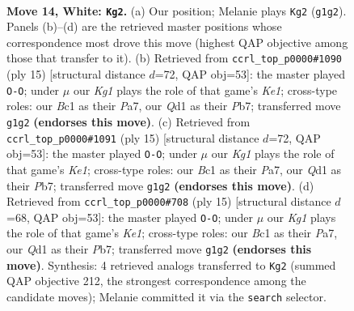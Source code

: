 \documentclass[11pt]{article}
\begin{document}
\clearpage

\begin{figure}[p]\centering
\begin{subfigure}{0.46\textwidth}\centering
\resizebox{\linewidth}{!}{%
\newchessgame
\chessboard[
  setfen={r1bqr1k1/pp1nbppp/2n1p3/8/2Pp2P1/1P3N1B/P2P1P1P/RNBQR1K1 w - - 2 14},
  showmover=false,
  pgfstyle=straightmove, color=movearrow, markmove={g1-g2}
]}
\caption{}
\end{subfigure}\hfill
\begin{subfigure}{0.46\textwidth}\centering
\resizebox{\linewidth}{!}{%
\newchessgame
\chessboard[
  setfen={r1bqk2r/pp2ppbp/2np1np1/8/4PP2/1NN5/PPP1B1PP/R1BQK2R b KQkq - 4 8},
  showmover=false,
  pgfstyle=straightmove, color=movearrow, markmove={e8-g8}
]}
\caption{}
\end{subfigure}
\\[4pt]
\begin{subfigure}{0.46\textwidth}\centering
\resizebox{\linewidth}{!}{%
\newchessgame
\chessboard[
  setfen={r1bqk2r/pp2ppbp/2np1np1/8/4PP2/1NN5/PPP1B1PP/R1BQK2R b KQkq - 4 8},
  showmover=false,
  pgfstyle=straightmove, color=movearrow, markmove={e8-g8}
]}
\caption{}
\end{subfigure}\hfill
\begin{subfigure}{0.46\textwidth}\centering
\resizebox{\linewidth}{!}{%
\newchessgame
\chessboard[
  setfen={r1bqk2r/pp2ppbp/2np1np1/8/2P1P3/2N5/PPN1BPPP/R1BQK2R b KQkq - 1 8},
  showmover=false,
  pgfstyle=straightmove, color=movearrow, markmove={e8-g8}
]}
\caption{}
\end{subfigure}
\caption{\textbf{Move 14, White: \texttt{Kg2}.} (a) Our position; Melanie plays \texttt{Kg2} (\texttt{g1g2}). Panels (b)--(d) are the retrieved master positions whose correspondence most drove this move (highest QAP objective among those that transfer to it). (b) Retrieved from \texttt{ccrl\_top\_p0000\#1090} (ply 15) [structural distance $d$=72, QAP obj=53]: the master played \texttt{O-O}; under $\mu$ our \emph{Kg1} plays the role of that game's \emph{Ke1}; cross-type roles: our \emph{B}c1 as their \emph{P}a7, our \emph{Q}d1 as their \emph{P}b7; transferred move \texttt{g1g2} \textbf{(endorses this move)}. (c) Retrieved from \texttt{ccrl\_top\_p0000\#1091} (ply 15) [structural distance $d$=72, QAP obj=53]: the master played \texttt{O-O}; under $\mu$ our \emph{Kg1} plays the role of that game's \emph{Ke1}; cross-type roles: our \emph{B}c1 as their \emph{P}a7, our \emph{Q}d1 as their \emph{P}b7; transferred move \texttt{g1g2} \textbf{(endorses this move)}. (d) Retrieved from \texttt{ccrl\_top\_p0000\#708} (ply 15) [structural distance $d$=68, QAP obj=53]: the master played \texttt{O-O}; under $\mu$ our \emph{Kg1} plays the role of that game's \emph{Ke1}; cross-type roles: our \emph{B}c1 as their \emph{P}a7, our \emph{Q}d1 as their \emph{P}b7; transferred move \texttt{g1g2} \textbf{(endorses this move)}. Synthesis: 4 retrieved analogs transferred to \texttt{Kg2} (summed QAP objective 212, the strongest correspondence among the candidate moves); Melanie committed it via the \texttt{search} selector.}
\label{fig:thought-m26}
\end{figure}
\end{document}
